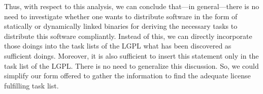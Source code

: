 Thus, with respect to this analysis, we can conclude that---in general---there
is no need to investigate whether one wants to distribute software in the form 
of statically or dynamically linked binaries for deriving the necessary tasks 
to distribute this software compliantly. 
Instead of this, we can directly incorporate those doings into the task lists 
of the LGPL what has been discovered as sufficient doings. 
Moreover, it is also sufficient to insert this statement only in the task list 
of the LGPL. 
There is no need to generalize this discussion. 
So, we could simplify our form offered to gather the information to find the 
adequate license fulfilling task list.


%
